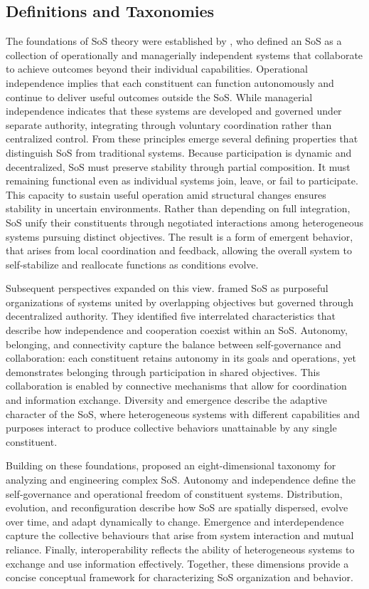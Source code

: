 \subsection{Definitions and Taxonomies}\label{subsec:background-sos-definitions}
The foundations of SoS theory were established by \citet{maier1998architecting}, who defined an SoS as a collection of operationally and managerially independent systems that collaborate to achieve outcomes beyond their individual capabilities. Operational independence implies that each constituent can function autonomously and continue to deliver useful outcomes outside the SoS. While managerial independence indicates that these systems are developed and governed under separate authority, integrating through voluntary coordination rather than centralized control. From these principles emerge several defining properties that distinguish SoS from traditional systems. Because participation is dynamic and decentralized, SoS must preserve stability through partial composition. It must remaining functional even as individual systems join, leave, or fail to participate. This capacity to sustain useful operation amid structural changes ensures stability in uncertain environments. Rather than depending on full integration, SoS unify their constituents through negotiated interactions among heterogeneous systems pursuing distinct objectives. The result is a form of emergent behavior, that arises from local coordination and feedback, allowing the overall system to self-stabilize and reallocate functions as conditions evolve.

Subsequent perspectives expanded on this view. \citet{boardman2006system} framed SoS as purposeful organizations of systems united by overlapping objectives but governed through decentralized authority. They identified five interrelated characteristics that describe how independence and cooperation coexist within an SoS. Autonomy, belonging, and connectivity capture the balance between self-governance and collaboration: each constituent retains autonomy in its goals and operations, yet demonstrates belonging through participation in shared objectives. This collaboration is enabled by connective mechanisms that allow for coordination and information exchange. Diversity and emergence describe the adaptive character of the SoS, where heterogeneous systems with different capabilities and purposes interact to produce collective behaviors unattainable by any single constituent.

Building on these foundations, \citet{nielsen2015systems} proposed an eight-dimensional taxonomy for analyzing and engineering complex SoS. Autonomy and independence define the self-governance and operational freedom of constituent systems. Distribution, evolution, and reconfiguration describe how SoS are spatially dispersed, evolve over time, and adapt dynamically to change. Emergence and interdependence capture the collective behaviours that arise from system interaction and mutual reliance. Finally, interoperability reflects the ability of heterogeneous systems to exchange and use information effectively. Together, these dimensions provide a concise conceptual framework for characterizing SoS organization and behavior.


